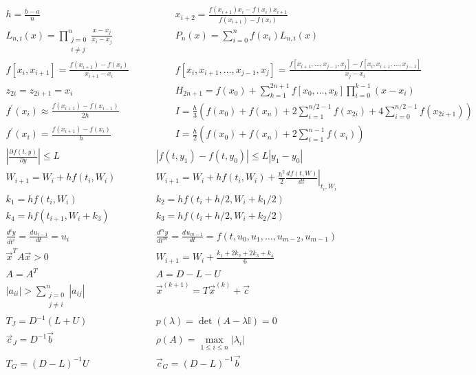 \documentclass[12pt]{article}
\newcommand{\I}{\ensuremath{\mathbb{I}}}
\newcommand{\diff}[3]{\frac{d^{#3}#1}{d#2^{#3}}}
\newcommand{\pdiff}[3]{\frac{\partial^{#3}#1}{\partial#2^{#3}}}
\newcommand{\abs}[1]{\left| #1 \right|}
\begin{document}
{\large
\[
\begin{array}{cc}
h = \frac{b - a}{n} \qquad & \qquad
x_{i+2} = \frac{f(x_{i+1}){x_i}-f(x_{i}){x_{i+1}}}{f(x_{i+1}) - f(x_i)} \\
L_{n, i}(x) = \prod\limits_{\substack{j=0\\ i \neq j}}^n \frac{x - x_j}{x_i - x_j} \qquad & \qquad
P_n(x) = \sum\limits_{i = 0}^n f(x_i)L_{n,i}(x) \\
f\left[x_i, x_{i+1}\right] = \frac{f(x_{i+1})-f(x_i)}{x_{i+1}-x_i} \qquad & \qquad
f\left[ x_i, x_{i+1}, \ldots, x_{j-1}, x_j\right] = \frac{f\left[x_{i+1}, \ldots, x_{j-1}, x_j\right] - f\left[ x_i, x_{i+1}, \ldots, x_{j-1} \right]}{x_j - x_i} \\
z_{2i} = z_{2i+1} = x_i \qquad & \qquad
H_{2n+1} = f(x_0) + \sum\limits_{k=1}^{2n+1} f\left[x_0, \ldots, x_k\right] \prod\limits_{i = 0}^{k-1}(x-x_i)  \\
f^\prime(x_i) \approx \frac{f(x_{i+1}) - f(x_{i-1})}{2h} \qquad & \qquad
I = \frac{h}{3}\left( f(x_0) + f(x_n) + 2\sum\limits_{i=1}^{n/2-1}f(x_{2i}) + 4\sum\limits_{i=0}^{n/2-1}f(x_{2i+1}) \right) \\
f^\prime(x_i) = \frac{f(x_{i+1})-f(x_i)}{h} \qquad & \qquad
I = \frac{h}{2}\left( f(x_0) + f(x_n) + 2\sum\limits_{i = 1}^{n-1}f(x_i)\right) \\
\abs{\pdiff{f(t,y)}{y}{}} \leq L & \abs{f(t, y_1) -f(t, y_0)} \leq L\abs{y_1 - y_0}\\
W_{i+1} = W_i + h f(t_i,W_i) & W_{i+1} = W_i + h f(t_i,W_i) + \frac{h^2}{2} \left.\diff{f(t,W)}{t}{} \right|_{t_i, W_i} \\
k_1  =  h f(t_i,W_i) & k_2  =  h f(t_i+h/2,W_i + k_1/2) \\
k_4  =  h f(t_{i+1},W_i + k_3) & k_3  =  h f(t_i+h/2,W_i + k_2/2)\\
\diff{y}{t}{i} = \diff{u_{i-1}}{t}{} = u_i & \diff{y}{t}{m} = \diff{u_{m-1}}{t}{} = f(t, u_0, u_1, \ldots, u_{m-2}, u_{m-1})\\
\vec{x}^T A\vec{x} > 0 & W_{i+1} = W_i + \frac{k_1+2k_2+2k_3+k_4}{6}\\
A = A^T & A = D - L - U\\
|a_{ii}| > \sum\limits_{\substack{j=0\\j\neq i}}^n |a_{ij}| & \vec{x}^{(k+1)} = T\vec{x}^{(k)} + \vec{c}\\
T_J = D^{-1}(L+U) & p(\lambda) = \det(A-\lambda \I) = 0\\
\vec{c}_J = D^{-1}\vec{b} & \rho(A) = \max\limits_{1\leq i\leq n}|\lambda_i|\\
T_G = {(D-L)}^{-1}U & \vec{c}_G = {(D-L)}^{-1}\vec{b}
\end{array}
\]
}
\end{document}
